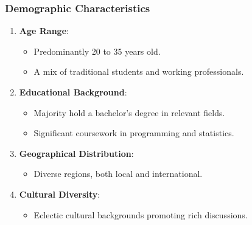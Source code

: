 \documentclass[aspectratio=169]{beamer}
\begin{document}
\begin{frame}[fragile]
    \frametitle{Demographic Characteristics}
    \begin{enumerate}
        \item \textbf{Age Range}:
        \begin{itemize}
            \item Predominantly 20 to 35 years old.
            \item A mix of traditional students and working professionals.
        \end{itemize}

        \item \textbf{Educational Background}:
        \begin{itemize}
            \item Majority hold a bachelor's degree in relevant fields.
            \item Significant coursework in programming and statistics.
        \end{itemize}

        \item \textbf{Geographical Distribution}:
        \begin{itemize}
            \item Diverse regions, both local and international.
        \end{itemize}

        \item \textbf{Cultural Diversity}:
        \begin{itemize}
            \item Eclectic cultural backgrounds promoting rich discussions.
        \end{itemize}
    \end{enumerate}
\end{frame}
\end{document}
